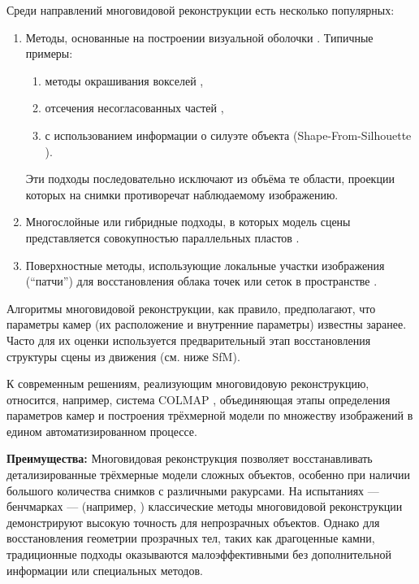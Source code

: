 Среди направлений многовидовой реконструкции есть несколько популярных:

\begin{enumerate}
	\item Методы, основанные на построении визуальной оболочки \cite{10.1109/34.273735}.
	Типичные примеры:
	\begin{enumerate}
		\item методы окрашивания вокселей \cite{10.5555/794189.794361},
		\item отсечения несогласованных частей \cite{10.5555/898435},
		\item с использованием информации о силуэте объекта (Shape-From-Silhouette \cite{Matusik2002VHull}).
	\end{enumerate}
	Эти подходы последовательно исключают из объёма те области, проекции которых
	на снимки противоречат наблюдаемому изображению.

	\item Многослойные или гибридные подходы, в которых модель сцены
	представляется совокупностью параллельных пластов \cite{10.1109/CVPR.1998.698642}.

	\item Поверхностные методы, использующие локальные участки изображения
	(``патчи'') для восстановления облака точек или сеток в пространстве \cite{10.1109/CVPR.2007.383246}.

\end{enumerate}

Алгоритмы многовидовой реконструкции, как правило, предполагают, что параметры
камер (их расположение и внутренние параметры) известны заранее. Часто для их
оценки используется предварительный этап восстановления структуры сцены из
движения (см. ниже SfM).

К современным решениям, реализующим многовидовую реконструкцию,
относится, например, система COLMAP \cite{schoenberger2016mvs}, объединяющая этапы определения параметров
камер и построения трёхмерной модели по множеству изображений в едином
автоматизированном процессе.

\textbf{Преимущества:} Многовидовая реконструкция позволяет восстанавливать
детализированные трёхмерные модели сложных объектов, особенно при наличии
большого количества снимков с различными ракурсами. На испытаниях — бенчмарках —
(например, \cite{Knapitsch2017}) классические методы многовидовой реконструкции
демонстрируют высокую точность для непрозрачных объектов. Однако для
восстановления геометрии прозрачных тел, таких как драгоценные камни,
традиционные подходы оказываются малоэффективными без дополнительной информации
или специальных методов.

